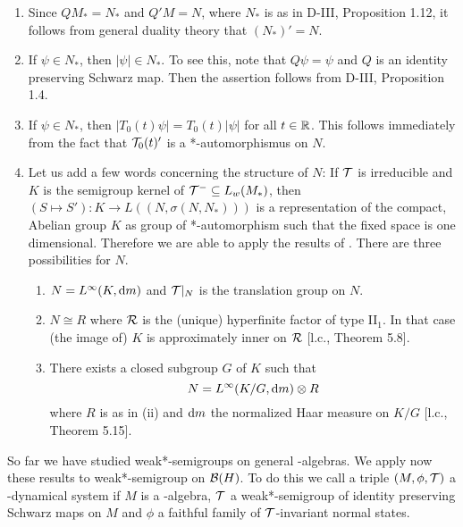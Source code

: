 \begin{remarks}\label{rem:d4-3.6}
\begin{enumerate}
\item
Since $QM_{*} = N_{*}$ and $Q'M = N$, where $N_{*}$ is as in D-III, Proposition 1.12, it follows from general duality theory that $(N_{*})' = N$.

\item
If $\psi \in N_{*}$, then $|\psi| \in N_{*}$.
To see this, note that $Q\psi = \psi$ and $Q$ is an identity preserving Schwarz map.
Then the assertion follows from D-III, Proposition 1.4.

\item
If $\psi \in N_{*}$, then $|T_{0}(t)\psi| = T_{0}(t)|\psi|$ for all $t \in \mathbb{R}$.
This follows immediately from the fact that $\mathcal{T}_{0}(t)'$ is a *-automorphismus on $N$.

\item
Let us add a few words concerning the structure of $N$: If $\mathcal{T}$ is irreducible and $K$ is the semigroup kernel of $\mathcal{T}^{-} \subseteq L_{w}(M_{*})$, then $(S \mapsto S'): K \to L((N,\sigma(N,N_{*})))$ is a representation of the compact, Abelian group $K$ as group of *-automorphism such that the fixed space is one dimensional.
Therefore we are able to apply the results of \citet{olesen:1980}.
There are three possibilities for $N$.

\begin{enumerate}[1.]
\item
$N = L^{\infty}(K,\mathop{}\!\mathrm{d}{m})$ and $\mathcal{T}|_{N}$ is the translation group on $N$.

\item
$N \cong R$ where $\mathcal{R}$ is the (unique) hyperfinite factor of type II$_{1}$.
In that case (the image of) $K$ is approximately inner on $\mathcal{R}$ [l.c., Theorem 5.8].


\item
There exists a closed subgroup $ G $  of $ K $  such that
\[
N = L^{\infty}(K/G, \mathop{}\!\mathrm{d}{m}) \otimes R
\]
where $ R $  is as in (ii) and $ \mathop{}\!\mathrm{d}{m} $  the normalized Haar measure on $ K/G $  [l.c., Theorem 5.15].
\end{enumerate}
\end{enumerate}
\end{remarks}
So far we have studied weak*-semigroups on general \WA-algebras.
We apply now these results to weak*-semigroup on $ \mathcal{B}(H) $.
To do this we call a triple $ (M,\phi,\mathcal{T}) $  a \WA-dynamical system if $ M $  is a \WA-algebra, $ \mathcal{T}$ a weak*-semigroup of identity preserving Schwarz maps on $ M $  and $ \phi $  a faithful family of $ \mathcal{T} $-invariant normal states.
